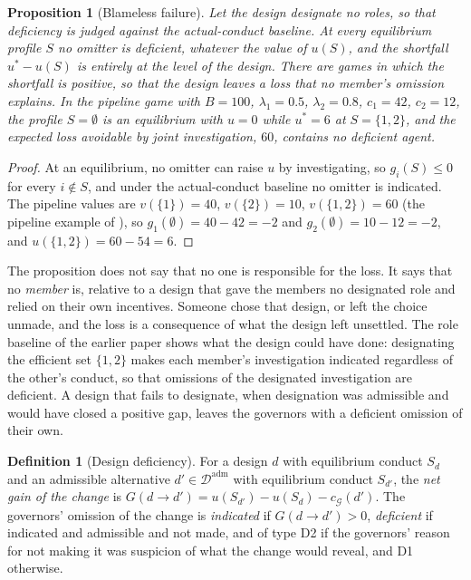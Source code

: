 \documentclass[11pt]{article}
\newcommand{\adm}{\mathrm{adm}}
\theoremstyle{plain}
\newtheorem{proposition}{Proposition}
\theoremstyle{definition}
\newtheorem{definition}{Definition}
\begin{document}
\begin{proposition}[Blameless failure]\label{prop:blameless}
Let the design designate no roles, so that deficiency is judged against the actual-conduct baseline. At every equilibrium profile $S$ no omitter is deficient, whatever the value of $u(S)$, and the shortfall $u^*-u(S)$ is entirely at the level of the design. There are games in which the shortfall is positive, so that the design leaves a loss that no member's omission explains. In the pipeline game with $B=100$, $\lambda_1=0.5$, $\lambda_2=0.8$, $c_1=42$, $c_2=12$, the profile $S=\emptyset$ is an equilibrium with $u=0$ while $u^*=6$ at $S=\{1,2\}$, and the expected loss avoidable by joint investigation, $60$, contains no deficient agent.
\end{proposition}

\begin{proof}
At an equilibrium, no omitter can raise $u$ by investigating, so $g_i(S)\le0$ for every $i\notin S$, and under the actual-conduct baseline no omitter is indicated. The pipeline values are $v(\{1\})=40$, $v(\{2\})=10$, $v(\{1,2\})=60$ (the pipeline example of \cite{flyxion2026shared}), so $g_1(\emptyset)=40-42=-2$ and $g_2(\emptyset)=10-12=-2$, and $u(\{1,2\})=60-54=6$.
\end{proof}

The proposition does not say that no one is responsible for the loss. It says that no \emph{member} is, relative to a design that gave the members no designated role and relied on their own incentives. Someone chose that design, or left the choice unmade, and the loss is a consequence of what the design left unsettled. The role baseline of the earlier paper shows what the design could have done: designating the efficient set $\{1,2\}$ makes each member's investigation indicated regardless of the other's conduct, so that omissions of the designated investigation are deficient. A design that fails to designate, when designation was admissible and would have closed a positive gap, leaves the governors with a deficient omission of their own.

\begin{definition}[Design deficiency]\label{def:designdef}
For a design $d$ with equilibrium conduct $S_d$ and an admissible alternative $d'\in\mathcal D^{\adm}$ with equilibrium conduct $S_{d'}$, the \emph{net gain of the change} is $G(d\to d')=u(S_{d'})-u(S_d)-c_{\mathcal G}(d')$. The governors' omission of the change is \emph{indicated} if $G(d\to d')>0$, \emph{deficient} if indicated and admissible and not made, and of type D2 if the governors' reason for not making it was suspicion of what the change would reveal, and D1 otherwise.
\end{definition}
\end{document}
